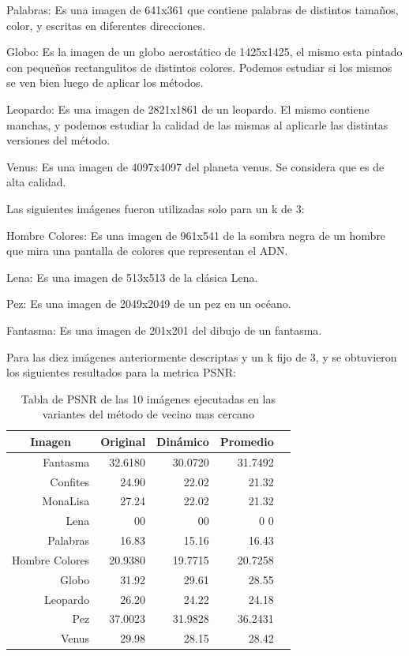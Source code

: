 \documentclass[a4paper]{article}
\newcounter{col}
\begin{document}
Palabras: Es una imagen de 641x361 que contiene palabras de distintos tamaños, color, y escritas en diferentes direcciones.

Globo: Es la imagen de un globo aerostático de 1425x1425, el mismo esta pintado con pequeños rectangulitos de distintos colores. Podemos estudiar si los mismos se ven bien luego de aplicar los métodos.

Leopardo: Es una imagen de 2821x1861 de un leopardo. El mismo contiene manchas, y podemos estudiar la calidad de las mismas al aplicarle las distintas versiones del método.

Venus: Es una imagen de 4097x4097 del planeta venus. Se considera que es de alta calidad.

Las siguientes imágenes fueron utilizadas solo para un k de 3:

Hombre Colores: Es una imagen de 961x541 de la sombra negra de un hombre que mira una pantalla de colores que representan el ADN.

Lena: Es una imagen de 513x513 de la clásica Lena.

Pez: Es una imagen de 2049x2049 de un pez en un océano.

Fantasma: Es una imagen de 201x201 del dibujo de un fantasma.

Para las diez imágenes anteriormente descriptas y un k fijo de 3, y se obtuvieron los siguientes resultados para la metrica PSNR:

\begin{table}[H]
\centering
\begin{tabular}{|r|r|r|r|r|}
\hline
\multicolumn{1}{|c|}{Imagen} & \multicolumn{1}{c|}{Original} & \multicolumn{1}{c|}{Dinámico} & \multicolumn{1}{c|}{Promedio} \\ \hline
Fantasma & 32.6180 & 30.0720 & 31.7492\\ \hline
Confites & 24.90 &  22.02 & 21.32 \\ \hline
MonaLisa &27.24 &  22.02 & 21.32  \\ \hline
Lena & 00 & 00 & 0 0 \\ \hline
Palabras & 16.83 &  15.16 & 16.43 \\ \hline
Hombre Colores & 20.9380 & 19.7715 & 20.7258  \\ \hline
Globo & 31.92 &  29.61 & 28.55 \\ \hline
Leopardo & 26.20 &  24.22 & 24.18 \\ \hline
Pez & 37.0023 & 31.9828 & 36.2431  \\ \hline
Venus  & 29.98 &  28.15 & 28.42 \\ \hline
\end{tabular}
\caption{Tabla de PSNR de las 10 im\'agenes ejecutadas en las variantes del m\'etodo de vecino mas cercano}
\label{}
\end{table}
\end{document}
